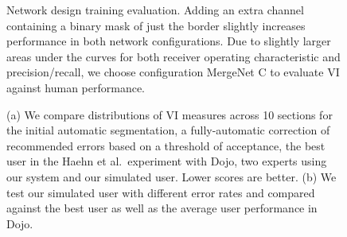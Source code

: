 \begin{figure}[ht]
 \caption{Network design training evaluation. Adding an extra channel containing a binary mask of just the border slightly increases performance in both network configurations. Due to slightly larger areas under the curves for both receiver operating characteristic and precision/recall, we choose configuration MergeNet C to evaluate VI against human performance.}
 \label{fig:trainingperformance}
\end{figure}


\begin{figure}[t]
 \centering
    \hfill

\caption{(a) We compare distributions of VI measures across 10 sections for the initial automatic segmentation, a fully-automatic correction of recommended errors based on a threshold of acceptance, the best user in the Haehn et al.~experiment with Dojo, two experts using our system and our simulated user. Lower scores are better. (b) We test our simulated user with different error rates and compared against the best user as well as the average user performance in Dojo.}
\label{fig:results}

\end{figure}


